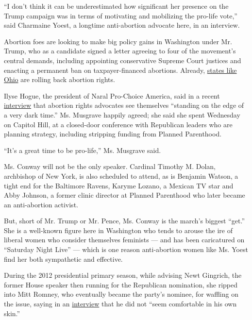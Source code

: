 ``I don't think it can be underestimated how significant her presence on
the Trump campaign was in terms of motivating and mobilizing the
pro-life vote,'' said Charmaine Yoest, a longtime anti-abortion advocate
here, in an interview.

Abortion foes are looking to make big policy gains in Washington under
Mr. Trump, who as a candidate signed a letter agreeing to four of the
movement's central demands, including appointing conservative Supreme
Court justices and enacting a permanent ban on taxpayer-financed
abortions. Already,
\href{https://www.nytimes3xbfgragh.onion/2016/12/11/us/abortion-foes-donald-trump-restrictions-politics.html}{states
like Ohio} are rolling back abortion rights.

Ilyse Hogue, the president of Naral Pro-Choice America, said in a recent
\href{https://www.nytimes3xbfgragh.onion/2016/12/11/us/abortion-foes-donald-trump-restrictions-politics.html}{interview}
that abortion rights advocates see themselves ``standing on the edge of
a very dark time.'' Ms. Musgrave happily agreed; she said she spent
Wednesday on Capitol Hill, at a closed-door conference with Republican
leaders who are planning strategy, including stripping funding from
Planned Parenthood.

``It's a great time to be pro-life,'' Ms. Musgrave said.

Ms. Conway will not be the only speaker. Cardinal Timothy M. Dolan,
archbishop of New York, is also scheduled to attend, as is Benjamin
Watson, a tight end for the Baltimore Ravens, Karyme Lozano, a Mexican
TV star and Abby Johnson, a former clinic director at Planned Parenthood
who later became an anti-abortion activist.

But, short of Mr. Trump or Mr. Pence, Ms. Conway is the march's biggest
``get.'' She is a well-known figure here in Washington who tends to
arouse the ire of liberal women who consider themselves feminists ---
and has been caricatured on ``Saturday Night Live'' --- which is one
reason anti-abortion women like Ms. Yoest find her both sympathetic and
effective.

During the 2012 presidential primary season, while advising Newt
Gingrich, the former House speaker then running for the Republican
nomination, she ripped into Mitt Romney, who eventually became the
party's nominee, for waffling on the issue, saying in an
\href{http://www.nytimes3xbfgragh.onion/2012/02/12/us/politics/romneys-path-to-pro-life-position-on-abortion.html}{interview}
that he did not ``seem comfortable in his own skin.''

